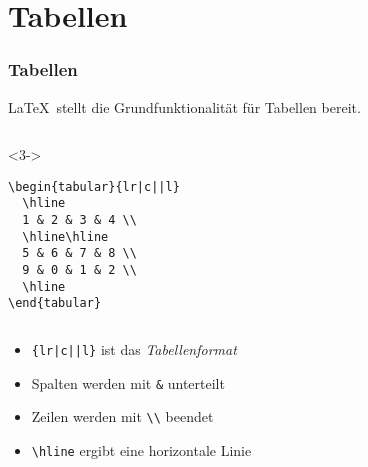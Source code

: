 \section{Tabellen}

\begin{frame}[fragile]
  \frametitle{Tabellen}


  \LaTeX\ stellt die Grundfunktionalität für Tabellen bereit.

  \begin{columns}
    \begin{column}{0.4\linewidth}
      \begin{block}<3->{}
\begin{lstlisting}
\begin{tabular}{lr|c||l}
  \hline
  1 & 2 & 3 & 4 \\
  \hline\hline
  5 & 6 & 7 & 8 \\
  9 & 0 & 1 & 2 \\
  \hline
\end{tabular}
\end{lstlisting}
      \end{block}
    \end{column}
    \begin{column}{0.5\linewidth}
      \centering
    \end{column}
  \end{columns}

  \begin{itemize}
  \item<4-> \lstinline!{lr|c||l}! ist das \emph{Tabellenformat}
  \item<5-> Spalten werden mit \lstinline|&| unterteilt
  \item<6-> Zeilen werden mit \lstinline|\\| beendet
  \item<7-> \lstinline|\hline| ergibt eine horizontale Linie
  \end{itemize}

\end{frame}

